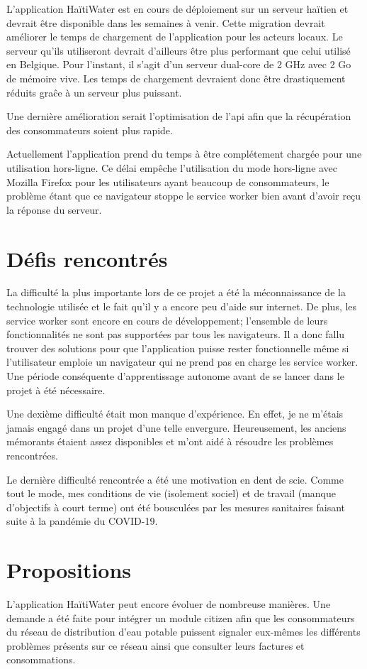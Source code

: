 \documentclass{EPL-master-thesis-covers-FR}
\begin{document}
			L'application HaïtiWater est en cours de déploiement sur un serveur haïtien et devrait être disponible dans les semaines à venir. Cette migration devrait améliorer le temps de chargement de l'application pour les acteurs locaux. Le serveur qu'ils utiliseront devrait d'ailleurs être plus performant que celui utilisé en Belgique. Pour l'instant, il s'agit d'un serveur dual-core de 2 GHz avec 2 Go de mémoire vive. Les temps de chargement devraient donc être drastiquement réduits graĉe à un serveur plus puissant. 
			
			Une dernière amélioration serait l'optimisation de l'\gls{api} afin que la récupération des consommateurs soient plus rapide.
		
			Actuellement l'application prend du temps à être complétement chargée pour une utilisation hors-ligne. Ce délai empêche l'utilisation du mode hors-ligne avec Mozilla Firefox pour les utilisateurs ayant beaucoup de consommateurs, le problème étant que ce navigateur stoppe le service worker bien avant d'avoir reçu la réponse du serveur.
					

		\section{Défis rencontrés}
			La difficulté la plus importante lors de ce projet a été la méconnaissance de la technologie utilisée et le fait qu'il y a encore peu d'aide sur internet. De plus, les service worker sont encore en cours de développement; l'ensemble de leurs fonctionnalités ne sont pas supportées par tous les navigateurs. Il a donc fallu trouver des solutions pour que l'application puisse rester fonctionnelle même si l'utilisateur emploie un navigateur qui ne prend pas en charge les service worker. Une période conséquente d'apprentissage autonome avant de se lancer dans le projet à été nécessaire.
			
			Une dexième difficulté était mon manque d'expérience. En effet, je ne m'étais jamais engagé dans un projet d'une telle envergure. Heureusement, les anciens mémorants étaient assez disponibles et m'ont aidé à résoudre les problèmes rencontrées.
			
			Le dernière difficulté rencontrée a été une motivation en dent de scie. Comme tout le mode, mes conditions de vie (isolement sociel) et de travail (manque d'objectifs à court terme) ont été bousculées par les mesures sanitaires faisant suite à la pandémie du COVID-19. 
			

		\section{Propositions}
		\label{sec:proposition}
			L'application HaïtiWater peut encore évoluer de nombreuse manières. Une demande a été faite pour intégrer un module \Gls{citizen} afin que les consommateurs du réseau de distribution d'eau potable puissent signaler eux-mêmes les différents problèmes présents sur ce réseau ainsi que consulter leurs factures et consommations.
			
\end{document}
